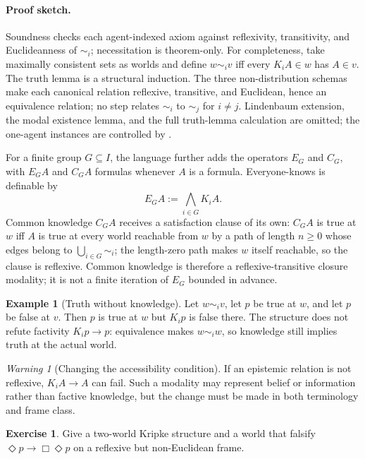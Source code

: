 \documentclass[11pt,oneside,openany]{book}
\theoremstyle{definition}
\newtheorem{example}[definition]{Example}
\newtheorem{exercise}[definition]{Exercise}
\theoremstyle{plain}
\theoremstyle{remark}
\newtheorem{warning}[definition]{Warning}
\newcommand{\defeq}{\mathrel{:=}}
\begin{document}
\paragraph{Proof sketch.}
Soundness checks each agent-indexed axiom against
reflexivity, transitivity, and Euclideanness of \(\sim_i\); necessitation is
theorem-only.  For completeness, take maximally consistent sets as worlds and
define \(w\sim_i v\) iff every \(K_iA\in w\) has \(A\in v\).  The
truth lemma is a structural induction.  The three non-distribution schemas
make each canonical relation reflexive, transitive, and Euclidean, hence an
equivalence relation; no step relates \(\sim_i\) to \(\sim_j\) for
\(i\ne j\).  Lindenbaum extension, the modal existence lemma, and the full
truth-lemma calculation are omitted; the one-agent instances are controlled by
\cite[Chapter 4]{BlackburnDeRijkeVenema2001}.

For a finite group \(G\subseteq I\), the language further adds the
operators \(E_G\) and \(C_G\), with \(E_GA\) and \(C_GA\) formulas
whenever \(A\) is a formula.  Everyone-knows is definable by
\[
  E_GA\defeq\bigwedge_{i\in G}K_iA.
\]
Common knowledge \(C_GA\) receives a satisfaction clause of its own:
\(C_GA\) is true at \(w\) iff \(A\) is true at every world reachable
from \(w\) by a path of length \(n\geq0\) whose edges belong to
\(\bigcup_{i\in G}\sim_i\); the length-zero path makes \(w\) itself
reachable, so the clause is reflexive.  Common knowledge is therefore a
reflexive-transitive closure modality; it is not a finite iteration of
\(E_G\) bounded in advance.

\begin{example}[Truth without knowledge]
Let \(w\sim_i v\), let \(p\) be true at \(w\), and let \(p\) be false at
\(v\).  Then \(p\) is true at \(w\) but \(K_ip\) is false there.  The structure
does not refute factivity \(K_ip\to p\): equivalence makes \(w\sim_i w\), so
knowledge still implies truth at the actual world.
\end{example}

\begin{warning}[Changing the accessibility condition]
If an epistemic relation is not reflexive, \(K_iA\to A\) can fail.  Such a
modality may represent belief or information rather than factive knowledge, but
the change must be made in both terminology and frame class.
\end{warning}

\begin{exercise}
\label{ex:modal-temporal-epistemic-01}
Give a two-world Kripke structure and a world that falsify
\(\Diamond p\to\Box\Diamond p\) on a reflexive but non-Euclidean frame.
\end{exercise}
\end{document}
